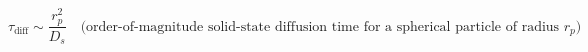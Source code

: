 \documentclass[preview]{standalone}
\begin{document}
\[\tau_\text{diff} \sim \frac{r_p^2}{D_s} \quad \text{(order-of-magnitude solid-state diffusion time for a spherical particle of radius } r_p\text{)} \tag{4.2}\]
\end{document}
